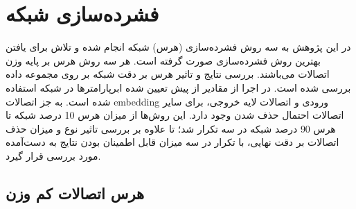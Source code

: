 \chapter{فشرده‌سازی شبکه 
}
\thispagestyle{empty}

در این پژوهش به سه روش فشرده‌سازی (هرس) شبکه
انجام شده و تلاش برای یافتن بهترین روش فشرده‌سازی صورت گرفته است. هر سه روش هرس بر پایه وزن اتصالات می‌باشند. بررسی نتایج و تاثیر هرس بر دقت شبکه بر روی مجموعه داده
\href{https://visualqa.org/download.html}{}
بررسی شده است. در اجرا از مقادیر از پیش تعیین شده ابرپارامتر‌ها 
در شبکه
استفاده شده است. 
\newline
به جز اتصالات embedding ورودی و اتصالات لایه خروجی، برای سایر اتصالات احتمال حذف شدن وجود دارد. این روش‌ها از میزان هرس 10 درصد شبکه تا هرس 90 درصد شبکه در سه 
تکرار شد؛ تا علاوه بر بررسی تاثیر نوع و میزان حذف اتصالات بر دقت نهایی، با تکرار در سه   
میزان قابل اطمینان بودن نتایج به دست‌آمده مورد بررسی قرار گیرد.
\newpage
\section{هرس اتصالات کم وزن}\label{LOWMagnitude}
	
